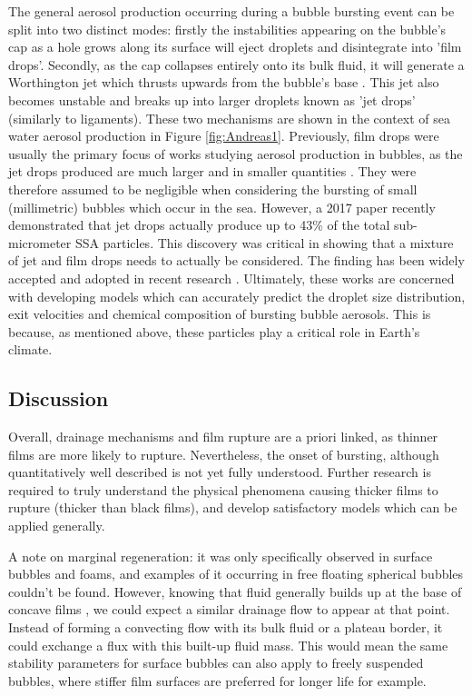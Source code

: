 \documentclass[a4paper,12pt]{article}
\numberwithin{equation}{section}
\numberwithin{figure}{section}
\numberwithin{table}{section}
\begin{document}
The general aerosol production occurring during a bubble bursting event can be split into two distinct modes: firstly the instabilities appearing on the bubble's cap as a hole grows along its surface will eject droplets and disintegrate into 'film drops'. Secondly, as the cap collapses entirely onto its bulk fluid, it will generate a Worthington jet which thrusts upwards from the bubble's base \cite{Lhuissier2011}. This jet also becomes unstable and breaks up into larger droplets known as 'jet drops' \cite{Spiel1998, Lhuissier2011} (similarly to ligaments). These two mechanisms are shown in the context of sea water aerosol production in Figure \ref{fig:Andreas1}. Previously, film drops were usually the primary focus of works studying aerosol production in bubbles, as the jet drops produced are much larger and in smaller quantities \cite{Wu1989, Modini2013, Spiel1998, Lhuissier2011}. They were therefore assumed to be negligible when considering the bursting of small (millimetric) bubbles which occur in the sea. However, a 2017 paper \cite{Wang2017} recently demonstrated that jet drops actually produce up to 43\% of the total sub-micrometer SSA particles. This discovery was critical in showing that a mixture of jet and film drops needs to actually be considered. The finding has been widely accepted and adopted in recent research \cite{Bertram2018, Deike2018}. Ultimately, these works are concerned with developing models which can accurately predict the droplet size distribution, exit velocities and chemical composition of bursting bubble aerosols. This is because, as mentioned above, these particles play a critical role in Earth's climate.

\subsection{Discussion}
Overall, drainage mechanisms and film rupture are a priori linked, as thinner films are more likely to rupture. Nevertheless, the onset of bursting, although quantitatively well described is not yet fully understood. Further research is required to truly understand the physical phenomena causing thicker films to rupture (thicker than black films), and develop satisfactory models which can be applied generally.

A note on marginal regeneration: it was only specifically observed in surface bubbles and foams, and examples of it occurring in free floating spherical bubbles couldn't be found. However, knowing that fluid generally builds up at the base of concave films \cite{Shen2020}, we could expect a similar drainage flow to appear at that point. Instead of forming a convecting flow with its bulk fluid or a plateau border, it could exchange a flux with this built-up fluid mass. This would mean the same stability parameters for surface bubbles can also apply to freely suspended bubbles, where stiffer film surfaces are preferred for longer life for example.
\end{document}
